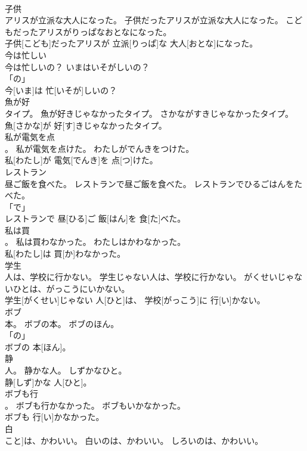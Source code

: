 \documentclass[8pt]{extreport}
\begin{document}
\begin{CJK}{UTF8}{min}
\\	子供
\\	アリスが立派な大人になった。	子供だったアリスが立派な大人になった。	こどもだったアリスがりっぱなおとなになった。	
\\	子供[こども]だったアリスが 立派[りっぱ]な 大人[おとな]になった。		
\\	今は忙しい
\\	今は忙しいの？	いまはいそがしいの？	
\\	「の」 
\\	今[いま]は 忙[いそが]しいの？		
\\	魚が好
\\	タイプ。	魚が好きじゃなかったタイプ。	さかながすきじゃなかったタイプ。	
\\	魚[さかな]が 好[す]きじゃなかったタイプ。		
\\	私が電気を点
\\	。	私が電気を点けた。	わたしがでんきをつけた。	
\\	私[わたし]が 電気[でんき]を 点[つ]けた。		
\\	レストラン
\\	昼ご飯を食べた。	レストランで昼ご飯を食べた。	レストランでひるごはんをたべた。	
\\	「で」 
\\	レストランで 昼[ひる]ご 飯[はん]を 食[た]べた。		
\\	私は買
\\	。	私は買わなかった。	わたしはかわなかった。	
\\	私[わたし]は 買[か]わなかった。		
\\	学生
\\	人は、学校に行かない。	学生じゃない人は、学校に行かない。	がくせいじゃないひとは、がっこうにいかない。	
\\	学生[がくせい]じゃない 人[ひと]は、 学校[がっこう]に 行[い]かない。		
\\	ボブ
\\	本。	ボブの本。	ボブのほん。	
\\	「の」 
\\	ボブの 本[ほん]。		
\\	静
\\	人。	静かな人。	しずかなひと。	
\\	静[しず]かな 人[ひと]。		
\\	ボブも行
\\	。	ボブも行かなかった。	ボブもいかなかった。	
\\	ボブも 行[い]かなかった。		
\\	白
\\	こと]は、かわいい。	白いのは、かわいい。	しろいのは、かわいい。	

\end{CJK}
\end{document}
